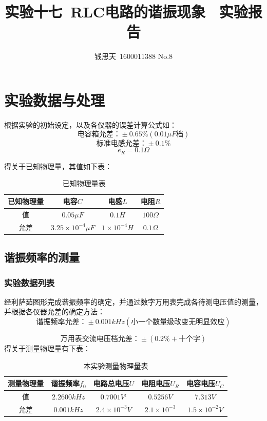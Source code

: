 \documentclass{ctexart}
\author{钱思天\ 1600011388 No.8}
\title{实验十七\ RLC电路的谐振现象 \ 实验报告}
\begin{document}
      \maketitle
      \section{实验数据与处理}
      根据实验的初始设定，以及各仪器的误差计算公式如：$$\mbox{电容箱允差：}\pm0.65\%(0.01\mu F\mbox{档})$$
          $$\mbox{标准电感允差：}\pm0.1\%$$
          $$e_R=0.1\Omega$$      
      
         得关于已知物理量，其值如下表：
\begin{table}[H]
  \centering
  \caption{已知物理量表}
    \begin{tabular}{|c|c|c|c|}\hline
    已知物理量 & 电容$C$ & 电感$L$ & 电阻$R$ \\\hline
    值     & $0.05\mu F$ & $0.1H$ & $100\Omega$ \\\hline
    允差    & $3.25\times 10^{-4}\mu F$ & $1\times 10^{-4}H$ & $0.1\Omega $ \\\hline
    \end{tabular}%
  \label{tab:addlabel}%
\end{table}%
      \subsection{谐振频率的测量}
      \subsubsection{实验数据列表}
        
经利萨茹图形完成谐振频率的确定，并通过数字万用表完成各待测电压值的测量，并根据各仪器允差的确定方法：
$$\mbox{谐振频率允差：}\pm0.001kHz(\mbox{小一个数量级改变无明显效应})$$

$$\mbox{万用表交流电压档允差：}\pm(0.2\%+\mbox{十个字})$$
得关于测量物理量有下表：
\begin{table}[H]
  \centering
  \caption{本实验测量物理量表}
    \begin{tabular}{|c|c|c|c|c|}\hline
    测量物理量 & 谐振频率$f_0$ & 电路总电压$U$ & 电阻电压$U_R$ & 电容电压$U_C$ \\\hline
    值     & $2.2600kHz$ & $0.7001V$` & $0.5256V$ & $7.313V$ \\\hline
    允差    & $0.001kHz$ & $2.4\times 10^{-3}V$ & $2.1\times10^{-3}$ & $1.5\times10^{-2}V$ \\\hline
    \end{tabular}%
  \label{tab:addlabel}%
\end{table}%
\end{document}
